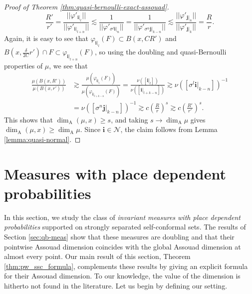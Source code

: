 \documentclass{PRM}
\theoremstyle{plain}
\theoremstyle{definition}
\theoremstyle{remark}
\begin{document}
\begin{proof}[Proof of Theorem \ref{thm:quasi-bernoulli-exact-assouad}]
\begin{equation*}
    \frac{R'}{r'}=\frac{||\varphi'_{\mathbf{i}|_{l}}||}{||\varphi'_{\mathbf{i}|_{l+n}}||}\lesssim \frac{1}{||\varphi'_{\sigma^l\mathbf{i}|_{n}}||}=\frac{1}{||\varphi'_{\sigma^{n}\mathbf{j}|_{k-n}}||}\lesssim\frac{ ||\varphi'_{\mathbf{j}|_{n}}||}{||\varphi'_{\mathbf{j}|_{k}}||}=\frac{R}{r}.
\end{equation*}
Again, it is easy to see that $\varphi_{\mathbf{i}|_{l}}(F)\subset B(x,CR')$ and $B(x,\frac{\delta}{2C}r')\cap F\subset \varphi_{\mathbf{i}|_{l+n}}(F)$, so using the doubling and quasi-Bernoulli properties of $\mu$, we see that
\begin{align*}
    \frac{\mu(B(x,R'))}{\mu(B(x,r'))}&\gtrsim\frac{\mu(\varphi_{\mathbf{i}|_{l}}(F))}{\mu(\varphi_{\mathbf{i}|_{l+k-n}}(F))}=\frac{\nu([\mathbf{i}|_{l}])}{\nu([\mathbf{i}|_{l+k-n}])}\gtrsim \nu([\sigma^l\mathbf{i}|_{k-n}])^{-1}\\
    &=\nu([\sigma^{n}\mathbf{j}|_{k-n}])^{-1} \gtrsim c\left(\frac{R}{r}\right)^s\gtrsim c\left(\frac{R'}{r'}\right)^s.
\end{align*}
This shows that $\dim_{\mathrm{A}}(\mu,x)\geq s$, and taking $s\to\dim_{\mathrm{A}}\mu$ gives $\dim_{\mathrm{A}}(\mu,x)\geq \dim_{\mathrm{A}}\mu$. Since $\mathbf{i}\in\mathcal{N}$, the claim follows from Lemma \ref{lemma:quasi-normal}.
\end{proof}


\section{Measures with place dependent probabilities}\label{sec:invmeas}
In this section, we study the class of \emph{invariant measures with place dependent probabilities} supported on strongly separated self-conformal sets. The results of Section \ref{sec:qb-meas} show that these measures are doubling and that their pointwise Assouad dimension coincides with the global Assouad dimension at almost every point. Our main result of this section, Theorem \ref{thm:pw_ssc_formula}, complements these results by giving an explicit formula for their Assouad dimension. To our knowledge, the value of the dimension is hitherto not found in the literature. Let us begin by defining our setting.
\end{document}
